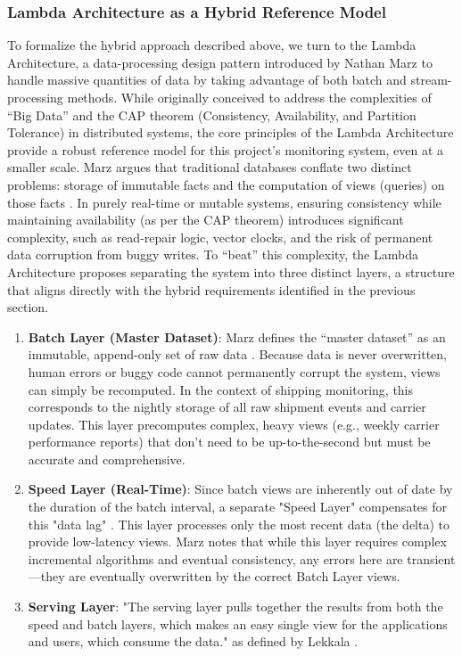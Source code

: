 \documentclass{imc-inf}
\begin{document}
\subsubsection{Lambda Architecture as a Hybrid Reference Model}
To formalize the hybrid approach described above, we turn to the Lambda Architecture, a data-processing design pattern introduced by Nathan Marz \cite{marzHowBeatCAP2011} to handle massive quantities of data by taking advantage of both batch and stream-processing methods.
While originally conceived to address the complexities of “Big Data” and the CAP theorem (Consistency, Availability, and Partition Tolerance) in distributed systems, the core principles of the Lambda Architecture provide a robust reference model for this project's monitoring system, even at a smaller scale.
Marz argues that traditional databases conflate two distinct problems: storage of immutable facts and the computation of views (queries) on those facts \cite{marzHowBeatCAP2011}.
In purely real-time or mutable systems, ensuring consistency while maintaining availability (as per the CAP theorem) introduces significant complexity, such as read-repair logic, vector clocks, and the risk of permanent data corruption from buggy writes.
To “beat” this complexity, the Lambda Architecture proposes separating the system into three distinct layers, a structure that aligns directly with the hybrid requirements identified in the previous section.

\begin{enumerate}[label=\arabic*., left=0pt, itemsep=3pt]
  \item \textbf{Batch Layer (Master Dataset)}: Marz defines the “master dataset” as an immutable, append-only set of raw data \cite{marzHowBeatCAP2011}. Because data is never overwritten, human errors or buggy code cannot permanently corrupt the system, views can simply be recomputed. In the context of shipping monitoring, this corresponds to the nightly storage of all raw shipment events and carrier updates. This layer precomputes complex, heavy views (e.g., weekly carrier performance reports) that don't need to be up-to-the-second but must be accurate and comprehensive.
  \item \textbf{Speed Layer (Real-Time)}: Since batch views are inherently out of date by the duration of the batch interval, a separate "Speed Layer" compensates for this "data lag" \cite{marzHowBeatCAP2011}. This layer processes only the most recent data (the delta) to provide low-latency views. Marz notes that while this layer requires complex incremental algorithms and eventual consistency, any errors here are transient—they are eventually overwritten by the correct Batch Layer views.
  \item \textbf{Serving Layer}: "The serving layer pulls together the results from both the speed and batch layers, which makes an easy single view for the applications and users, which consume the data." as defined by Lekkala \cite{lekkalaLeveragingLambdaArchitecture2020}.
\end{enumerate}
\end{document}
